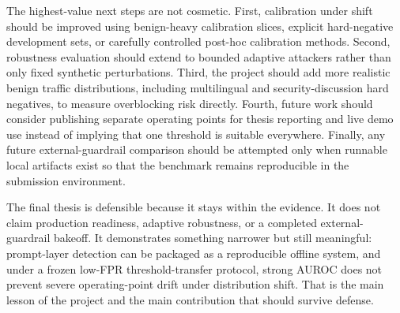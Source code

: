The highest-value next steps are not cosmetic. First, calibration under shift should be improved using benign-heavy calibration slices, explicit hard-negative development sets, or carefully controlled post-hoc calibration methods. Second, robustness evaluation should extend to bounded adaptive attackers rather than only fixed synthetic perturbations. Third, the project should add more realistic benign traffic distributions, including multilingual and security-discussion hard negatives, to measure overblocking risk directly. Fourth, future work should consider publishing separate operating points for thesis reporting and live demo use instead of implying that one threshold is suitable everywhere. Finally, any future external-guardrail comparison should be attempted only when runnable local artifacts exist so that the benchmark remains reproducible in the submission environment.

The final thesis is defensible because it stays within the evidence. It does not claim production readiness, adaptive robustness, or a completed external-guardrail bakeoff. It demonstrates something narrower but still meaningful: prompt-layer detection can be packaged as a reproducible offline system, and under a frozen low-FPR threshold-transfer protocol, strong AUROC does not prevent severe operating-point drift under distribution shift. That is the main lesson of the project and the main contribution that should survive defense.

